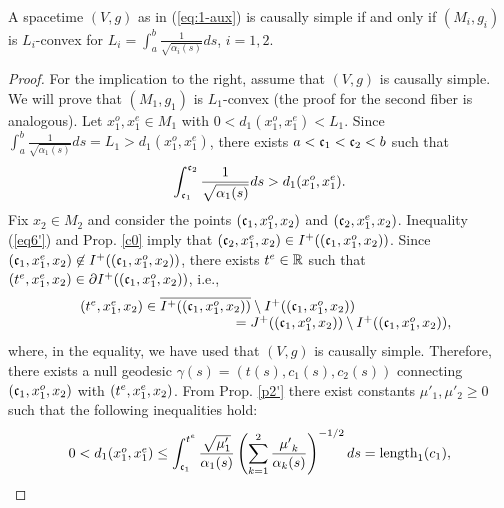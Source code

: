 \begin{thm}
\label{causi}
A \multiwarped spacetime $(V,g)$ as in (\ref{eq:1-aux}) is causally simple if and only if $(M_i,g_i)$ is $L_i$-convex for $L_i=\int_{a}^{b}\frac{1}{\sqrt{\alpha_{i}(s)}}ds$, $i=1,2$.
\end{thm}

\begin{proof} For the implication to the right, assume that $(V,g)$ is causally simple. We will prove that
$(M_1,g_1)$ is $L_1$-convex (the proof for the second fiber is analogous). Let $x^o_{1},x^e_{1} \in M_{1}$ with $0<d_1(x^o_{1},x^e_{1})<L_1$. Since
$\int_{a}^{b}\frac{1}{\sqrt{\alpha_1(s)}}ds=L_1 > d_1(x^o_{1},x^e_{1})$, there exists $a<\mathfrak{c}_1<\mathfrak{c}_2<b$ such that
\begin{equation}
\label{eq6'}
\int_{\mathfrak{c}_1}^{\mathfrak{c}_2} \frac{1}{\sqrt{\alpha_{1}(s)}}ds>d_{1}(x^o_{1},x^e_{1}).
\end{equation}
Fix $x_{2} \in M_{2}$ and consider
the points $(\mathfrak{c}_1,x_{1}^o,x_{2})$ and $(\mathfrak{c}_2,x_{1}^e,x_{2})$. Inequality (\ref{eq6'}) and Prop. \ref{c0} imply that
$(\mathfrak{c}_2,x_{1}^e,x_{2}) \in I^{+}((\mathfrak{c}_1,x_{1}^o,x_{2}))$.
Since $(\mathfrak{c}_1,x_{1}^e,x_{2}) \not \in I^+((\mathfrak{c}_1,x_{1}^o,x_{2}))$, there exists
$t^e \in {\mathbb R}$ such that $(t^e,x^e_{1},x_{2}) \in \partial I^{+}((\mathfrak{c}_1,x^o_{1},x_{2}))$,
i.e.,
\[
\begin{array}{c}
(t^e,x^e_{1},x_{2}) \in \overline{I^{+}((\mathfrak{c}_1,x^o_{1},x_{2}))} \setminus I^{+}((\mathfrak{c}_1,x^o_{1},x_{2})) \qquad\qquad\qquad \\ \qquad\qquad\qquad\qquad\qquad\qquad=J^{+}((\mathfrak{c}_1,x^o_{1},x_{2}))\setminus I^{+}((\mathfrak{c}_1,x^o_{1},x_{2})),
\end{array}
\]
where, in the equality, we have used that $(V,g)$ is causally simple. Therefore, there exists a null geodesic
$\gamma(s)=(t(s),c_{1}(s),c_{2}(s))$ connecting $(\mathfrak{c}_1,x^o_{1},x_{2})$ with $(t^e,x^e_{1},x_{2})$.
From Prop. \ref{p2'} there exist constants $\mu'_1, \mu'_2\geq 0$ such that the following inequalities hold:
\[
\begin{array}{c}
0<d_{1}(x^o_{1},x^e_{1})\leq \displaystyle\int_{\mathfrak{c}_1}^{t^e} \frac{\sqrt{\mu'_{1}}}{\alpha_{1}(s)}\left(\sum_{k=1}^{2} \frac{{\mu'}_{k}}{\alpha_{k}(s)} \right)^{-1/2}ds=\hbox{length}_1(c_{1}),

\end{array}\]
\end{proof}
